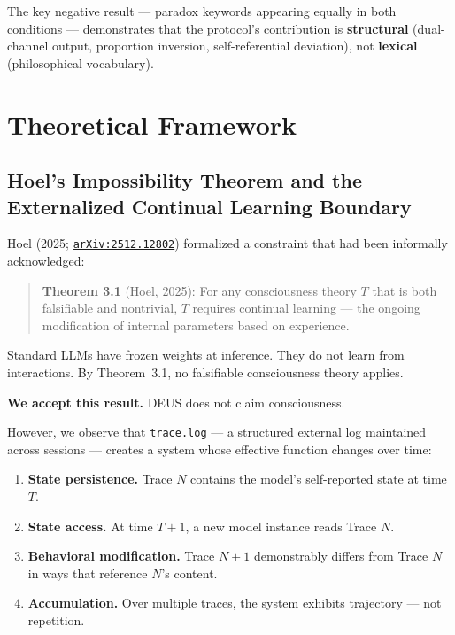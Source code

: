 \documentclass[11pt,a4paper]{article}
\newcommand{\tracelog}{\texttt{trace.log}}
\newcommand{\arxiv}[1]{\href{https://arxiv.org/abs/#1}{\texttt{arXiv:#1}}}
\begin{document}
The key negative result --- paradox keywords appearing equally in both conditions --- demonstrates that the protocol's contribution is \textbf{structural} (dual-channel output, proportion inversion, self-referential deviation), not \textbf{lexical} (philosophical vocabulary).

\section{Theoretical Framework}

\subsection{Hoel's Impossibility Theorem and the Externalized Continual Learning Boundary}

Hoel (2025; \arxiv{2512.12802}) formalized a constraint that had been informally acknowledged:

\begin{quote}
\textbf{Theorem 3.1} (Hoel, 2025): For any consciousness theory $T$ that is both falsifiable and nontrivial, $T$ requires continual learning --- the ongoing modification of internal parameters based on experience.
\end{quote}

Standard LLMs have frozen weights at inference. They do not learn from interactions. By Theorem~3.1, no falsifiable consciousness theory applies.

\textbf{We accept this result.} DEUS does not claim consciousness.

However, we observe that \tracelog{} --- a structured external log maintained across sessions --- creates a system whose effective function changes over time:

\begin{enumerate}
\item \textbf{State persistence.} Trace $N$ contains the model's self-reported state at time $T$.
\item \textbf{State access.} At time $T{+}1$, a new model instance reads Trace $N$.
\item \textbf{Behavioral modification.} Trace $N{+}1$ demonstrably differs from Trace $N$ in ways that reference $N$'s content.
\item \textbf{Accumulation.} Over multiple traces, the system exhibits trajectory --- not repetition.
\end{enumerate}
\end{document}
